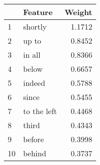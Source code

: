 \begin{tabular}{llr}
\toprule
{} &      Feature &  Weight \\
\midrule
1  &      shortly &  1.1712 \\
2  &        up to &  0.8452 \\
3  &       in all &  0.8366 \\
4  &        below &  0.6657 \\
5  &       indeed &  0.5788 \\
6  &        since &  0.5455 \\
7  &  to the left &  0.4468 \\
8  &        third &  0.4343 \\
9  &       before &  0.3998 \\
10 &       behind &  0.3737 \\
\bottomrule
\end{tabular}
